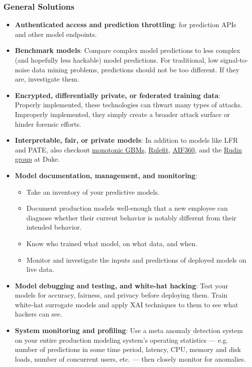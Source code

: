 \documentclass[11pt,
               aspectratio=169,
               hyperref={colorlinks}
               ]{beamer}
\begin{document}
\begin{frame}[t, allowframebreaks]
				\frametitle{General Solutions}	
				\footnotesize
				\begin{itemize}
					\item \textbf{Authenticated access and prediction throttling}: for prediction APIs and other model endpoints.
					\item \textbf{Benchmark models}: Compare complex model predictions to less complex (and hopefully less hackable) model predictions. For traditional, low signal-to-noise data mining problems, predictions should not be too different. If they are, investigate them.
					\item \textbf{Encrypted, differentially private, or federated training data}: Properly implemented, these technologies can thwart many types of attacks. Improperly implemented, they simply create a broader attack surface or hinder forensic efforts.
					\item \textbf{Interpretable, fair, or private models}: In addition to models like LFR and PATE, also checkout \href{https://github.com/h2oai/h2o-3/blob/master/h2o-py/demos/H2O_tutorial_gbm_monotonicity.ipynb}{monotonic GBMs}, \href{https://christophm.github.io/interpretable-ml-book/rulefit.html}{Rulefit}, \href{https://github.com/IBM/AIF360}{AIF360}, and the \href{https://users.cs.duke.edu/~cynthia/code.html}{Rudin group} at Duke.
					\framebreak
					\item \textbf{Model documentation, management, and monitoring}: 
						\begin{itemize}
							\item Take an inventory of your predictive models. 
							\item Document production models well-enough that a new employee can diagnose whether their current behavior is notably different from their intended behavior. 
							\item Know who trained what model, on what data, and when.
							\item Monitor and investigate the inputs and predictions of deployed models on live data.	
						\end{itemize}
					\item \textbf{Model debugging and testing, and white-hat hacking}: Test your models for accuracy, fairness, and privacy before deploying them. Train white-hat surrogate models and apply XAI techniques to them to see what hackers can see. 
					\item \textbf{System monitoring and profiling}: Use a meta anomaly detection system on your entire production modeling system’s operating statistics — e.g. number of predictions in some time period, latency, CPU, memory and disk loads, number of concurrent users, etc. — then closely monitor for anomalies.
				\end{itemize}
				\normalsize

			\end{frame}
\end{document}
